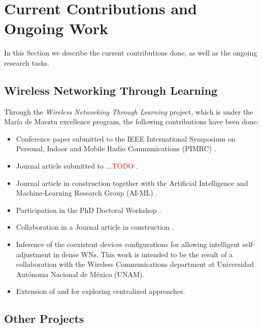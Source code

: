 \documentclass[12pt, a4paper,twoside]{tesi_upf}
\begin{document}
	\chapter{Current Contributions and Ongoing Work}
	\label{section:contributions}
	
		In this Section we describe the current contributions done, as well as the ongoing research tasks.

		\section{Wireless Networking Through Learning}
		\label{section:mdm}		
			Through the \textit{Wireless Networking Through Learning} project, which is under the Mar\'ia de Maeztu excellence program, the following contributions have been done:
			\begin{itemize}
				\item Conference paper submitted to the IEEE International Symposium on Personal, Indoor and Mobile Radio Communications (PIMRC) \cite{wilhelmi2017implications}.
				\item Journal article submitted to ...\textcolor{red}{TODO} \cite{wilhelmi2017enhancing}.
				\item Journal article in construction together with the Artificial Intelligence and Machine-Learning Research Group (AI-ML) \cite{bellalta2017learning}.
				\item Participation in the PhD Doctoral Workshop \cite{wilhelmi2017improving}.
				\item Collaboration in a Journal article in construction \cite{barrachina2017ctmn}.
				\item Inference of the coexistent devices configurations for allowing intelligent self-adjustment in dense WNs. This work is intended to be the result of a collaboration with the Wireless Communications department at Universidad Aut\'onoma Nacional de M\'exico (UNAM).
				\item Extension of \cite{wilhelmi2017enhancing} and \cite{wilhelmi2017implications} for exploring centralized approaches.
			\end{itemize}	
			
		\section{Other Projects}
		\label{section:other_projects}	
\end{document}
